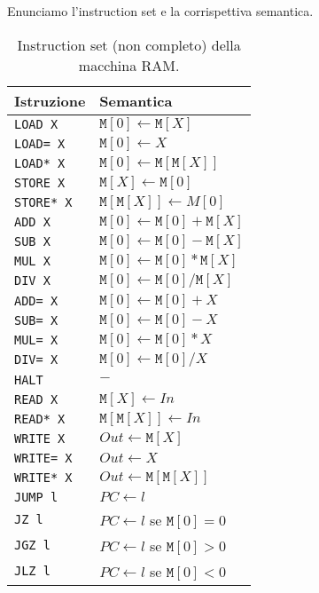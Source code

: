 \documentclass[a4paper,11pt,twoside]{article}
\theoremstyle{plain}
\theoremstyle{definition}
\theoremstyle{remark}
\begin{document}
Enunciamo l'instruction set e la corrispettiva semantica.

\begin{table}[htb]
  \centering
  \begin{tabular}{ll}
    \toprule
    Istruzione & Semantica \\
    \midrule
    \texttt{LOAD X}   & $\mathtt{M}[0] \gets \mathtt{M}[X]$ \\
    \texttt{LOAD= X}  & $\mathtt{M}[0] \gets X$ \\
    \texttt{LOAD* X}  & $\mathtt{M}[0] \gets \mathtt{M}[\mathtt{M}[X]]$ \\
    \texttt{STORE X}  & $\mathtt{M}[X] \gets \mathtt{M}[0]$ \\
    \texttt{STORE* X} & $\mathtt{M}[\mathtt{M}[X]] \gets M[0]$ \\
    \texttt{ADD X}    & $\mathtt{M}[0] \gets \mathtt{M}[0] + \mathtt{M}[X]$ \\
    \texttt{SUB X}    & $\mathtt{M}[0] \gets \mathtt{M}[0] - \mathtt{M}[X]$ \\
    \texttt{MUL X}    & $\mathtt{M}[0] \gets \mathtt{M}[0] * \mathtt{M}[X]$ \\
    \texttt{DIV X}    & $\mathtt{M}[0] \gets \mathtt{M}[0] / \mathtt{M}[X]$ \\
    \texttt{ADD= X}   & $\mathtt{M}[0] \gets \mathtt{M}[0] + X$ \\
    \texttt{SUB= X}   & $\mathtt{M}[0] \gets \mathtt{M}[0] - X$ \\
    \texttt{MUL= X}   & $\mathtt{M}[0] \gets \mathtt{M}[0] * X$ \\
    \texttt{DIV= X}   & $\mathtt{M}[0] \gets \mathtt{M}[0] / X$ \\
    \texttt{HALT}     & $-$ \\
    \texttt{READ X}   & $\mathtt{M}[X] \gets In$ \\
    \texttt{READ* X}  & $\mathtt{M}[\mathtt{M}[X]] \gets In$ \\
    \texttt{WRITE X}  & $Out \gets \mathtt{M}[X]$ \\
    \texttt{WRITE= X} & $Out \gets X$ \\
    \texttt{WRITE* X} & $Out \gets \mathtt{M}[\mathtt{M}[X]]$ \\
    \texttt{JUMP l}   & $PC \gets l$ \\
    \texttt{JZ l}     & $PC \gets l$ se $\mathtt{M}[0] = 0$ \\
    \texttt{JGZ l}    & $PC \gets l$ se $\mathtt{M}[0] > 0$ \\
    \texttt{JLZ l}    & $PC \gets l$ se $\mathtt{M}[0] < 0$ \\
    \bottomrule
  \end{tabular}
  \caption{Instruction set (non completo) della macchina RAM\@.}%
  \label{tab:ram-isa}
\end{table}
\end{document}
